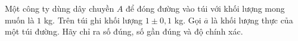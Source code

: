 \begin{ex}
Một công ty dùng dây chuyền $A$ để đóng đường vào túi với khối lượng mong muốn là $1$ kg. Trên túi ghi khối lượng $1\pm0{,}1$ kg. Gọi $\overline a$ là khối lượng thực của một túi đường. Hãy chỉ ra số đúng, số gần đúng và độ chính xác.
\end{ex}
